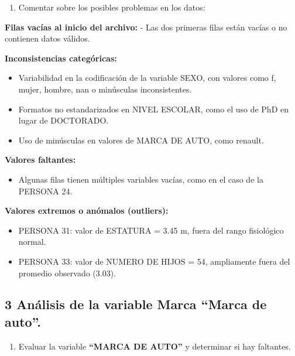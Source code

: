 \documentclass[
]{article}
\providecommand{\tightlist}{%
  \setlength{\itemsep}{0pt}\setlength{\parskip}{0pt}}
\begin{document}
\begin{enumerate}
\def\labelenumi{\alph{enumi}.}
\setcounter{enumi}{5}
\tightlist
\item
  Comentar sobre los posibles problemas en los datos:
\end{enumerate}

\textbf{Filas vacías al inicio del archivo:} - Las dos primeras filas
están vacías o no contienen datos válidos.

\textbf{Inconsistencias categóricas:}

\begin{itemize}
\tightlist
\item
  Variabilidad en la codificación de la variable SEXO, con valores como
  f, mujer, hombre, nan o minúsculas inconsistentes.
\item
  Formatos no estandarizados en NIVEL ESCOLAR, como el uso de PhD en
  lugar de DOCTORADO.
\item
  Uso de minúsculas en valores de MARCA DE AUTO, como renault.
\end{itemize}

\textbf{Valores faltantes:}

\begin{itemize}
\tightlist
\item
  Algunas filas tienen múltiples variables vacías, como en el caso de la
  PERSONA 24.
\end{itemize}

\textbf{Valores extremos o anómalos (outliers):}

\begin{itemize}
\tightlist
\item
  PERSONA 31: valor de ESTATURA = 3.45 m, fuera del rango fisiológico
  normal.
\item
  PERSONA 33: valor de NUMERO DE HIJOS = 54, ampliamente fuera del
  promedio observado (3.03).
\end{itemize}

\newpage

\subsection{3 Análisis de la variable Marca ``Marca de
auto''.}\label{anuxe1lisis-de-la-variable-marca-marca-de-auto.}

\begin{enumerate}
\def\labelenumi{\alph{enumi}.}
\tightlist
\item
  Evaluar la variable \textbf{``MARCA DE AUTO''} y determinar si hay
  faltantes.
\end{enumerate}
\end{document}
